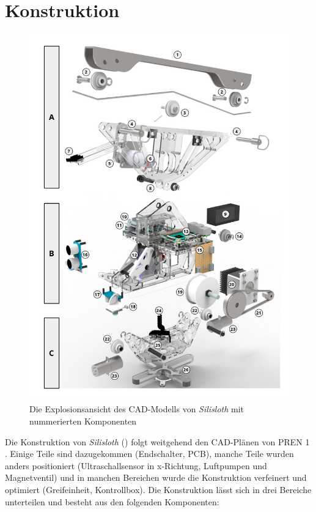\section{Konstruktion}
\label{sec:konstruktion}

\begin{figure}
    \centering
    \includegraphics[width=1.0\linewidth]{graphs/beschriftung.png}
    \caption{Die Explosionsansicht des CAD-Modells von \textit{Silisloth} mit nummerierten Komponenten}
    \label{fig:explosionsansicht}
\end{figure}

Die Konstruktion von \textit{Silisloth} () folgt weitgehend den CAD-Plänen von PREN 1 \cite[S. 12-13]{pren1}. Einige Teile sind dazugekommen (Endschalter, PCB), manche Teile wurden anders positioniert (Ultraschallsensor in x-Richtung, Luftpumpen und Magnetventil) und in manchen Bereichen wurde die Konstruktion verfeinert und optimiert (Greifeinheit, Kontrollbox). Die Konstruktion lässt sich in drei Bereiche unterteilen und besteht aus den folgenden Komponenten:


